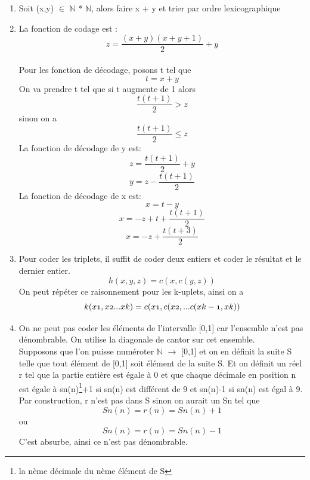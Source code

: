 \documentclass[]{article}
\begin{document}
\noindent{}\\\\

\begin{enumerate}
\item Soit (x,y) $\in$ $\mathbb{N}$ * $\mathbb{N}$, alors faire x + y et trier par ordre lexicographique
\item La fonction de codage est : \[z = \frac{(x+y)(x+y+1)}{2} + y\]\\
Pour les fonction de décodage, posons t tel que \[t = x + y\]
On va prendre t tel que si t augmente de 1 alors \[\frac{t(t+1)}{2} > z\] sinon on a \[\frac{t(t+1)}{2} \le z\]
La fonction de décodage de y est: \[z =\frac{t(t+1)}{2} + y\] \[y = z - \frac{t(t+1)}{2}\]
La fonction de décodage de x est: \[x = t - y\] \[x = -z + t + \frac{t(t+1)}{2}\] \[x = -z + \frac{t(t+3)}{2}\]
\item Pour coder les triplets, il suffit de coder deux entiers et coder le résultat et le dernier entier. 
  \[h(x,y,z)=c(x , c(y,z))\]
On peut répéter ce raisonnement pour les k-uplets, ainsi on a 
\[k(x\oldstylenums{1},x\oldstylenums{2}... x\oldstylenums{k}) = c(x\oldstylenums{1} , c(x\oldstylenums{2} , ... c(x\oldstylenums{k-1},x\oldstylenums{k}))\]
\item On ne peut pas coder les éléments de l'intervalle [0,1] car l'ensemble n'est pas dénombrable. On utilise la diagonale de cantor sur cet ensemble.\\
Supposons que l'on puisse numéroter $\mathbb{N}$  $\rightarrow$ [0,1] et on en définit la suite S telle que tout élément de [0,1] soit élément de la suite S.
Et on définit un réel r tel que la partie entière est égale à 0 et que chaque décimale en position n est égale à sn(n)\footnote{la nème décimale du nème élément de S}+1 si sn(n) est différent de 9 et sn(n)-1 si sn(n) est égal à 9.\\
Par construction, r n'est pas dans S sinon on aurait un Sn tel que \[Sn(n)=r(n)=Sn(n)+1\] ou \[Sn(n)=r(n)=Sn(n)-1\] C'est absurbe, ainsi ce n'est pas dénombrable. 
   
  
\end{enumerate}
\end{document}
